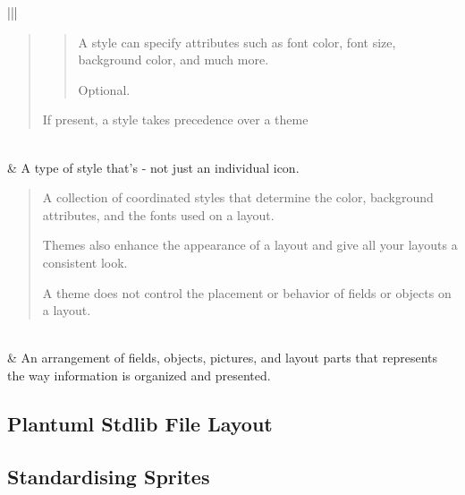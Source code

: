 \documentclass[letterpaper,10pt,english]{sphinxmanual}
\begin{document}
\begin{savenotes}
\begin{tabular}[t]{|||}
\begin{quote}
\begin{quote}
A style can specify attributes such as font color, font size, background color, and much more.

Optional.
\end{quote}

If present, a style takes precedence over a theme
\end{quote}
\\
\hline
{}
&
A type of style that’s  - not just an individual icon.
\begin{quote}

A collection of coordinated styles that determine the color, background attributes, and the fonts used on a layout.

Themes also enhance the appearance of a layout and give all your layouts a consistent look.

A theme does not control the placement or behavior of fields or objects on a layout.
\end{quote}
\\
\hline
{}
&
An arrangement of fields, objects, pictures, and layout parts that represents the way information is organized and presented.
\\
\hline
\end{tabular}
\par
\sphinxattableend\end{savenotes}



\subsection{Plantuml Stdlib File Layout}
\label{\detokenize{Stdlib/StandardisingStdLib2:plantuml-stdlib-file-layout}}
\begin{figure}[htbp]
\centering

\noindent{}
\end{figure}


\subsection{Standardising Sprites}
\label{\detokenize{Stdlib/StandardisingStdLib2:standardising-sprites}}
\end{document}
